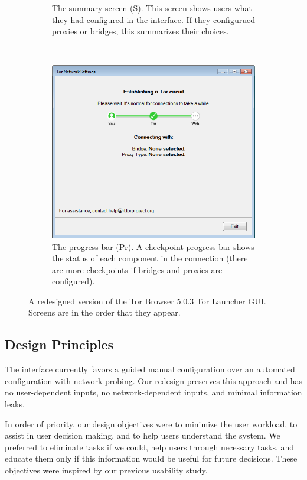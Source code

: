 \documentclass[USenglish,oneside,twocolumn]{article}
\begin{document}
\begin{figure}
\begin{subfigure}[b]{0.30\textwidth}
	\centering\captionsetup{width=1.5\linewidth}%
	\caption{The summary screen (S). This screen shows users what they had configured in the interface. If they  configurued proxies or bridges, this summarizes their choices.}
	\label{fig:new-summary}
\end{subfigure}
~~~~~~~~~~~~~~~~~~~~~~~~~
\begin{subfigure}[b]{0.30\textwidth}
	\includegraphics[width=\textwidth]{screenshots/NEW-progress.png}
	\centering\captionsetup{width=1.5\linewidth}%
	\caption{The progress bar (Pr). A checkpoint progress bar shows the status of each component in the connection (there are more checkpoints if bridges and proxies are configured).}
	\label{fig:new-progress}
\end{subfigure}
\caption{
A redesigned version of the Tor Browser 5.0.3 Tor Launcher GUI. Screens are in the order that they appear. 
}
\label{fig:new-interface}
\end{figure} 

\subsection{Design Principles} 
The interface currently favors a guided manual configuration over an automated configuration with network probing. Our redesign preserves this approach and has no user-dependent inputs, no network-dependent inputs, and minimal information leaks.

In order of priority, our design objectives were to minimize the user workload, to assist in user decision making, and to help users understand the system. We preferred to eliminate tasks if we could, help users through necessary tasks, and educate them only if this information would be useful for future decisions. These objectives were inspired by our previous usability study. 
\end{document}
